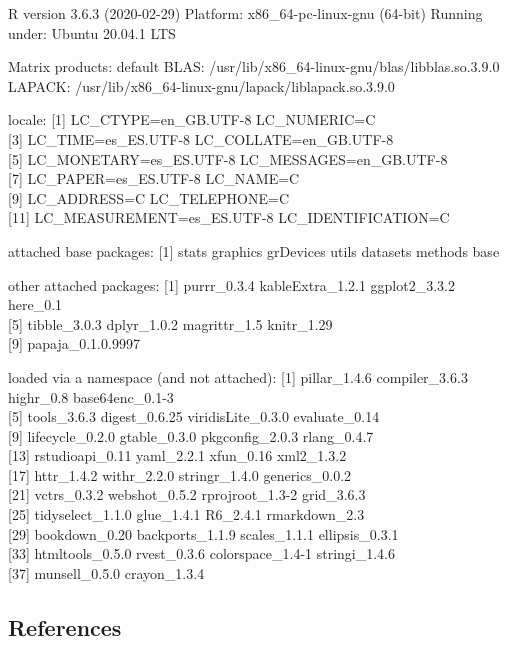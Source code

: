 \begin{appendix}
R version 3.6.3 (2020-02-29) Platform: x86\_64-pc-linux-gnu (64-bit)
Running under: Ubuntu 20.04.1 LTS

Matrix products: default BLAS:
/usr/lib/x86\_64-linux-gnu/blas/libblas.so.3.9.0 LAPACK:
/usr/lib/x86\_64-linux-gnu/lapack/liblapack.so.3.9.0

locale: {[}1{]} LC\_CTYPE=en\_GB.UTF-8 LC\_NUMERIC=C\\
{[}3{]} LC\_TIME=es\_ES.UTF-8 LC\_COLLATE=en\_GB.UTF-8\\
{[}5{]} LC\_MONETARY=es\_ES.UTF-8 LC\_MESSAGES=en\_GB.UTF-8\\
{[}7{]} LC\_PAPER=es\_ES.UTF-8 LC\_NAME=C\\
{[}9{]} LC\_ADDRESS=C LC\_TELEPHONE=C\\
{[}11{]} LC\_MEASUREMENT=es\_ES.UTF-8 LC\_IDENTIFICATION=C

attached base packages: {[}1{]} stats graphics grDevices utils datasets
methods base

other attached packages: {[}1{]} purrr\_0.3.4 kableExtra\_1.2.1
ggplot2\_3.3.2 here\_0.1\\
{[}5{]} tibble\_3.0.3 dplyr\_1.0.2 magrittr\_1.5 knitr\_1.29\\
{[}9{]} papaja\_0.1.0.9997

loaded via a namespace (and not attached): {[}1{]} pillar\_1.4.6
compiler\_3.6.3 highr\_0.8 base64enc\_0.1-3\\
{[}5{]} tools\_3.6.3 digest\_0.6.25 viridisLite\_0.3.0 evaluate\_0.14\\
{[}9{]} lifecycle\_0.2.0 gtable\_0.3.0 pkgconfig\_2.0.3 rlang\_0.4.7\\
{[}13{]} rstudioapi\_0.11 yaml\_2.2.1 xfun\_0.16 xml2\_1.3.2\\
{[}17{]} httr\_1.4.2 withr\_2.2.0 stringr\_1.4.0 generics\_0.0.2\\
{[}21{]} vctrs\_0.3.2 webshot\_0.5.2 rprojroot\_1.3-2 grid\_3.6.3\\
{[}25{]} tidyselect\_1.1.0 glue\_1.4.1 R6\_2.4.1 rmarkdown\_2.3\\
{[}29{]} bookdown\_0.20 backports\_1.1.9 scales\_1.1.1 ellipsis\_0.3.1\\
{[}33{]} htmltools\_0.5.0 rvest\_0.3.6 colorspace\_1.4-1
stringi\_1.4.6\\
{[}37{]} munsell\_0.5.0 crayon\_1.3.4

\hypertarget{references}{%
\subsection*{References}\label{references}}


\end{appendix}
